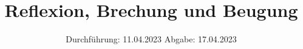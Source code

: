 

\subject{V400}
\title{Reflexion, Brechung und Beugung}
\date{%
  Durchführung: 11.04.2023
  \hspace{3em}
  Abgabe: 17.04.2023
}



\maketitle
\thispagestyle{empty}
\tableofcontents
\newpage






\printbibliography{}



